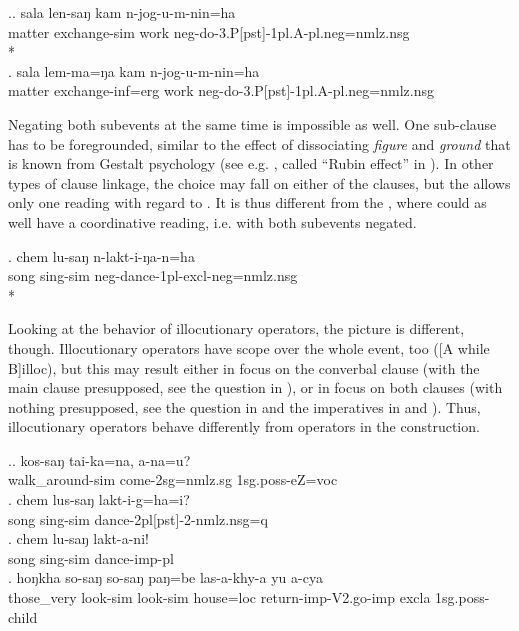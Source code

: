 \ex.\ag.	sala len-saŋ kam n-jog-u-m-nin=ha\\
			matter exchange-{\sc sim} work {\sc neg-}do{\sc -3.P[pst]-1pl.A-pl.neg=nmlz.nsg}\\
			*\\
	\bg.	sala lem-ma=ŋa kam n-jog-u-m-nin=ha\\
			matter exchange{\sc -inf=erg} work {\sc neg-}do{\sc -3.P[pst]-1pl.A-pl.neg=nmlz.nsg}\\
		
Negating both subevents at the same time is impossible as well. One sub-clause has to be foregrounded, similar to the effect of dissociating \emph{figure} and \emph{ground} that is known from Gestalt psychology (see e.g. \citet{Jackendoff1983Semantics}, called “Rubin effect” in \citet[48]{Bickel1991Typologische}). In other types of clause linkage, the choice may fall on either of the clauses, but the  allows only one reading with regard to . It is thus different from the , where  could as well have a coordinative reading, i.e. with both subevents negated.

\exg.	chem lu-saŋ n-lakt-i-ŋa-n=ha\\
		song sing-{\sc sim} {\sc neg-}dance{\sc -1pl-excl-neg=nmlz.nsg}\\
		*\\
		
		
Looking at the behavior of illocutionary operators, the picture is different, though. Illocutionary operators have scope over the whole event, too ([A while B]{\sc illoc}), but this may result either in focus on the converbal clause (with the main clause presupposed, see the question in \Next[a]), or in focus on both clauses (with nothing presupposed, see the question in \Next[b] and the imperatives in \Next[c] and \Next[d]). Thus, illocutionary operators behave differently from  operators in the  construction. 

\ex.\ag.	kos-saŋ tai-ka=na, a-na=u?\\
		walk\_around{\sc -sim} come{\sc [npst]-2sg=nmlz.sg} {\sc 1sg.poss-}eZ={\sc voc}\\
		  
\bg.	chem lus-saŋ lakt-i-g=ha=i?\\
		song   sing-{\sc sim} dance{\sc -2pl[pst]-2-nmlz.nsg=q}\\
\bg.	chem lu-saŋ lakt-a-ni!\\
		song   sing-{\sc sim} dance{\sc -imp-pl}\\
\bg. hoŋkha so-saŋ   so-saŋ   paŋ=be   las-a-khy-a     yu    a-cya\\
 those\_very look{\sc -sim} look{\sc -sim} house{\sc =loc} return{\sc -imp-V2.go-imp}  {\sc excla}   {\sc 1sg.poss-}child\\
  

